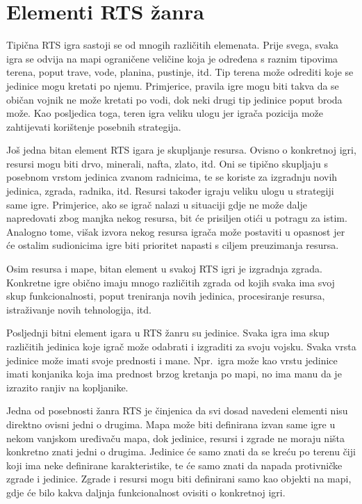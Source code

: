 \documentclass[times, utf8, zavrsni, numeric]{fer}
\begin{document}
\section{Elementi RTS žanra}

\par Tipična RTS igra sastoji se od mnogih različitih elemenata.
Prije svega, svaka igra se odvija na mapi ograničene veličine koja je određena s raznim tipovima terena, poput trave, vode, planina, pustinje, itd. 
Tip terena može odrediti koje se jedinice mogu kretati po njemu.
Primjerice, pravila igre mogu biti takva da se običan vojnik ne može kretati po vodi, dok neki drugi tip jedinice poput broda može.
Kao posljedica toga, teren igra veliku ulogu jer igrača pozicija može zahtijevati korištenje posebnih strategija.

\par Još jedna bitan element RTS igara je skupljanje resursa.
Ovisno o konkretnoj igri, resursi mogu biti drvo, minerali, nafta, zlato, itd. Oni se tipično skupljaju s posebnom vrstom jedinica zvanom radnicima, te se koriste za izgradnju novih jedinica, zgrada, radnika, itd.
Resursi također igraju veliku ulogu u strategiji same igre.
Primjerice, ako se igrač nalazi u situaciji gdje ne može dalje napredovati zbog manjka nekog resursa, bit će prisiljen otići u potragu za istim.
Analogno tome, višak izvora nekog resursa igrača može postaviti u opasnost jer će ostalim sudionicima igre biti prioritet napasti s ciljem preuzimanja resursa.

\par Osim resursa i mape, bitan element u svakoj RTS igri je izgradnja zgrada. 
Konkretne igre obično imaju mnogo različitih zgrada od kojih svaka ima svoj skup funkcionalnosti, poput treniranja novih jedinica, procesiranje resursa, istraživanje novih tehnologija, itd.  

\par Posljednji bitni element igara u RTS žanru su jedinice. 
Svaka igra ima skup različitih jedinica koje igrač može odabrati i izgraditi za svoju vojsku.
Svaka vrsta jedinice može imati svoje prednosti i mane.
Npr.\ igra može kao vrstu jedinice imati konjanika koja ima prednost brzog kretanja po mapi, no ima manu da je izrazito ranjiv na kopljanike.

\par Jedna od posebnosti žanra RTS je činjenica da svi dosad navedeni elementi nisu direktno ovisni jedni o drugima.
Mapa može biti definirana izvan same igre u nekom vanjskom uređivaču mapa, dok jedinice, resursi i zgrade ne moraju ništa konkretno znati jedni o drugima.
Jedinice će samo znati da se kreću po terenu čiji koji ima neke definirane karakteristike, te će samo znati da napada protivničke zgrade i jedinice. 
Zgrade i resursi mogu biti definirani samo kao objekti na mapi, gdje će bilo kakva daljnja funkcionalnost ovisiti o konkretnoj igri.
\end{document}
